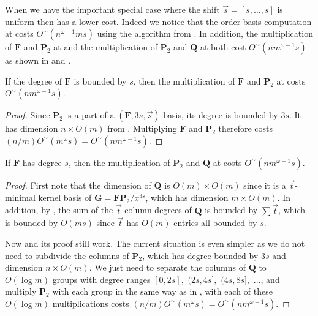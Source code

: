 When we have the important special case where the shift $\vec{s}=\left[s,\dots,s\right]$
is uniform then 
has a lower cost. Indeed we notice that the order basis computation
at  costs $O^{\sim}\left(n^{\omega-1}ms\right)$
using the algorithm from . In addition,
the multiplication of $\mathbf{F}$ and $\mathbf{P}_{2}$ at 
and the multiplication of $\mathbf{P}_{2}$ and $\mathbf{Q}$ at 
both cost $O^{\sim}\left(nm^{\omega-1}s\right)$ as shown in 
and . 
\begin{lem}
\label{lem:multiplyFP2WithUniformShift}If the degree of $\mathbf{F}$
is bounded by $s$, then the multiplication of $\mathbf{F}$ and $\mathbf{P}_{2}$
at  costs $O^{\sim}\left(nm^{\omega-1}s\right)$.\end{lem}
\begin{proof}
Since $\mathbf{P}_{2}$ is a part of a $\left(\mathbf{F},3s,\vec{s}\right)$-basis,
its degree is bounded by $3s$. It has dimension $n\times O\left(m\right)$
from .
Multiplying $\mathbf{F}$ and $\mathbf{P}_{2}$ therefore costs $(n/m)O^{\sim}\left(m^{\omega}s\right)=O^{\sim}\left(nm^{\omega-1}s\right)$.\end{proof}
\begin{lem}
\label{lem:multiplyP2QWithUniformShift}If $\mathbf{F}$ has degree
$s$, then the multiplication of $\mathbf{P}_{2}$ and $\mathbf{Q}$
at  costs $O^{\sim}\left(nm^{\omega-1}s\right)$.\end{lem}
\begin{proof}
First note that the dimension of $\mathbf{Q}$ is $O\left(m\right)\times O\left(m\right)$
since it is a $\vec{t}$-minimal kernel basis of $\mathbf{G}=\mathbf{F}\mathbf{P}_{2}/x^{3s}$,
which has dimension $m\times O\left(m\right)$. In addition, by ,
the sum of the $\vec{t}$-column degrees of $\mathbf{Q}$ is bounded
by $\sum\vec{t}$, which is bounded by $O\left(ms\right)$ since $\vec{t}$
has $O\left(m\right)$ entries all bounded by $s$.

Now  and its proof still
work. The current situation is even simpler as we do not need to subdivide
the columns of $\mathbf{P}_{2}$, which has degree bounded by $3s$
and dimension $n\times O\left(m\right)$. We just need to separate
the columns of $\mathbf{Q}$ to $O\left(\log m\right)$ groups with
degree ranges $\left[0,2s\right],$ $(2s,4s],$ $(4s,8s],$ $\dots$,
and multiply $\mathbf{P}_{2}$ with each group in the same way as
in , with each of these
$O\left(\log m\right)$ multiplications costs $(n/m)O^{\sim}\left(m^{\omega}s\right)=O^{\sim}\left(nm^{\omega-1}s\right)$.\end{proof}
